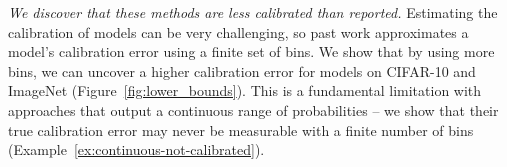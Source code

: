 


\emph{We discover that these methods are less calibrated than reported.} Estimating the calibration of models can be very challenging, so past work approximates a model's calibration error using a finite set of bins. We show that by using more bins, we can uncover a higher calibration error for models on CIFAR-10 and ImageNet (Figure~\ref{fig:lower_bounds}). This is a fundamental limitation with approaches that output a continuous range of probabilities -- we show that their true calibration error may never be measurable with a finite number of bins (Example~\ref{ex:continuous-not-calibrated}).

